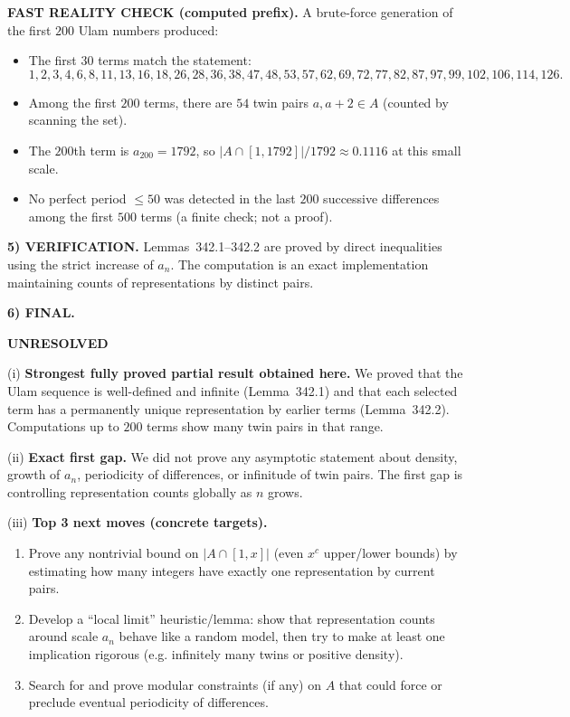 \medskip
\noindent\textbf{FAST REALITY CHECK (computed prefix).}
A brute-force generation of the first $200$ Ulam numbers produced:
\begin{itemize}
\item The first $30$ terms match the statement:
\[1,2,3,4,6,8,11,13,16,18,26,28,36,38,47,48,53,57,62,69,72,77,82,87,97,99,102,106,114,126.\]
\item Among the first $200$ terms, there are $54$ twin pairs $a,a+2\in A$ (counted by scanning the set).
\item The $200$th term is $a_{200}=1792$, so $|A\cap[1,1792]|/1792\approx 0.1116$ at this small scale.
\item No perfect period $\le 50$ was detected in the last $200$ successive differences among the first $500$ terms (a finite check; not a proof).
\end{itemize}

\medskip
\noindent\textbf{5) VERIFICATION.}
Lemmas~342.1--342.2 are proved by direct inequalities using the strict increase of $a_n$.
The computation is an exact implementation maintaining counts of representations by distinct pairs.

\medskip
\noindent\textbf{6) FINAL.}

\noindent\textbf{UNRESOLVED}

\smallskip
\noindent (i) \textbf{Strongest fully proved partial result obtained here.}
We proved that the Ulam sequence is well-defined and infinite (Lemma~342.1) and that each selected term has a permanently unique representation by earlier terms (Lemma~342.2). Computations up to $200$ terms show many twin pairs in that range.

\smallskip
\noindent (ii) \textbf{Exact first gap.}
We did not prove any asymptotic statement about density, growth of $a_n$, periodicity of differences, or infinitude of twin pairs. The first gap is controlling representation counts globally as $n$ grows.

\smallskip
\noindent (iii) \textbf{Top 3 next moves (concrete targets).}
\begin{enumerate}
\item Prove any nontrivial bound on $|A\cap[1,x]|$ (even $x^c$ upper/lower bounds) by estimating how many integers have exactly one representation by current pairs.
\item Develop a ``local limit'' heuristic/lemma: show that representation counts around scale $a_n$ behave like a random model, then try to make at least one implication rigorous (e.g. infinitely many twins or positive density).
\item Search for and prove modular constraints (if any) on $A$ that could force or preclude eventual periodicity of differences.
\end{enumerate}

